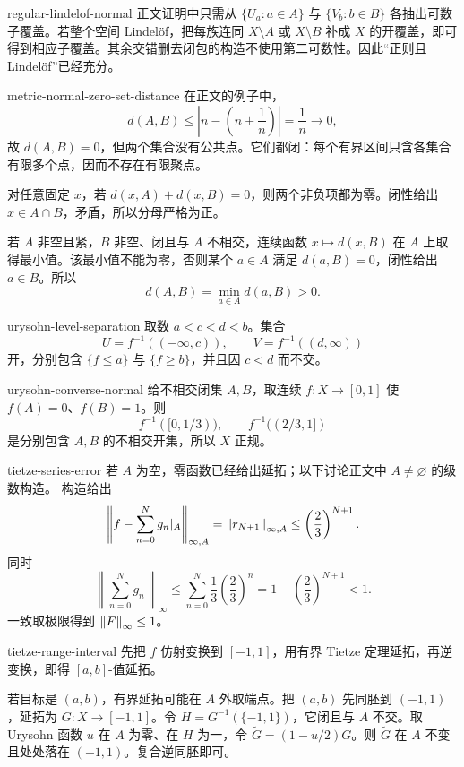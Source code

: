 \begin{solution}{regular-lindelof-normal}
正文证明中只需从 \(\{U_a:a\in A\}\) 与 \(\{V_b:b\in B\}\) 各抽出可数子覆盖。若整个空间 Lindelöf，把每族连同 \(X\setminus A\) 或 \(X\setminus B\) 补成 \(X\) 的开覆盖，即可得到相应子覆盖。其余交错删去闭包的构造不使用第二可数性。因此“正则且 Lindelöf”已经充分。
\end{solution}

\begin{solution}{metric-normal-zero-set-distance}
在正文的例子中，
\[
 d(A,B)\le\left|n-\left(n+\frac1n\right)\right|=\frac1n\longrightarrow0,
\]
故 \(d(A,B)=0\)，但两个集合没有公共点。它们都闭：每个有界区间只含各集合有限多个点，因而不存在有限聚点。

对任意固定 \(x\)，若
\(d(x,A)+d(x,B)=0\)，则两个非负项都为零。闭性给出
\(x\in A\cap B\)，矛盾，所以分母严格为正。

若 \(A\) 非空且紧，\(B\) 非空、闭且与 \(A\) 不相交，连续函数 \(x\mapsto d(x,B)\) 在 \(A\) 上取得最小值。该最小值不能为零，否则某个 \(a\in A\) 满足
\(d(a,B)=0\)，闭性给出 \(a\in B\)。所以
\[
 d(A,B)=\min_{a\in A}d(a,B)>0.
\]
\end{solution}

\begin{solution}{urysohn-level-separation}
取数 \(a<c<d<b\)。集合
\[
 U=f^{-1}((-\infty,c)),\qquad V=f^{-1}((d,\infty))
\]
开，分别包含 \(\{f\le a\}\) 与 \(\{f\ge b\}\)，并且因 \(c<d\) 而不交。
\end{solution}

\begin{solution}{urysohn-converse-normal}
给不相交闭集 \(A,B\)，取连续 \(f:X\to[0,1]\) 使 \(f(A)=0\)、\(f(B)=1\)。则
\[
 f^{-1}([0,1/3)),\qquad f^{-1}((2/3,1])
\]
是分别包含 \(A,B\) 的不相交开集，所以 \(X\) 正规。
\end{solution}

\begin{solution}{tietze-series-error}
若 \(A\) 为空，零函数已经给出延拓；以下讨论正文中 \(A\ne\varnothing\) 的级数构造。
构造给出
\[
 \left\|f-\sum_{n=0}^{N}g_n|_A\right\|_{\infty,A}
 =\left\lVert r_{N+1}\right\rVert_{\infty,A}
 \le\left(\frac23\right)^{N+1}.
\]
同时
\[
 \left\|\sum_{n=0}^{N}g_n\right\|_\infty
 \le\sum_{n=0}^{N}\frac13\left(\frac23\right)^n
 =1-\left(\frac23\right)^{N+1}<1.
\]
一致取极限得到 \(\left\lVert F\right\rVert_\infty\le1\)。
\end{solution}

\begin{solution}{tietze-range-interval}
先把 \(f\) 仿射变换到 \([-1,1]\)，用有界 Tietze 定理延拓，再逆变换，即得 \([a,b]\)-值延拓。

若目标是 \((a,b)\)，有界延拓可能在 \(A\) 外取端点。把 \((a,b)\) 先同胚到 \((-1,1)\)，延拓为 \(G:X\to[-1,1]\)。令 \(H=G^{-1}(\{-1,1\})\)，它闭且与 \(A\) 不交。取 Urysohn 函数 \(u\) 在 \(A\) 为零、在 \(H\) 为一，令
\(\widetilde G=(1-u/2)G\)。则 \(\widetilde G\) 在 \(A\) 不变且处处落在 \((-1,1)\)。复合逆同胚即可。
\end{solution}

